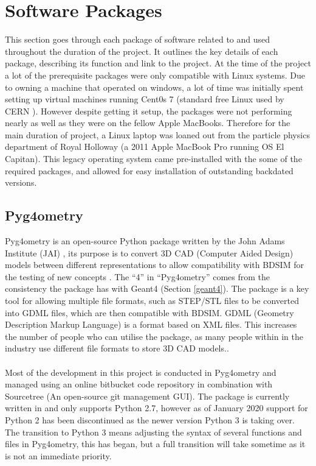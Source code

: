 \documentclass[12pt,a4paper]{article}
\begin{document}

\section{Software Packages}
\label{packs}
This section goes through each package of software related to and used throughout the duration of the project. It outlines the key details of each package, describing its function and link to the project. At the time of the project a lot of the prerequisite packages were only compatible with Linux systems. Due to owning a machine that operated on windows, a lot of time was initially spent setting up virtual machines running Cent0s 7 (standard free Linux used by CERN \cite{cern}). However despite getting it setup, the packages were not performing nearly as well as they were on the fellow Apple MacBooks. Therefore for the main duration of project, a Linux laptop was loaned out from the particle physics department of Royal Holloway (a 2011 Apple MacBook Pro running OS El Capitan). This legacy operating system came pre-installed with the some of the required packages, and allowed for easy installation of outstanding backdated versions.

\subsection{Pyg4ometry}
\label{pyg}
Pyg4ometry is an open-source Python package  written by the John Adams Institute (JAI) \cite{jai}, its purpose is to convert 3D CAD (Computer Aided Design) models between different representations to allow compatibility with BDSIM for the testing of new concepts \cite{pyg4om}. The ``4'' in ``Pyg4ometry'' comes from the consistency the package has with Geant4 (Section \ref{geant4}). The package is a key tool for allowing multiple file formats, such as STEP/STL files to be converted into GDML files, which are then compatible with BDSIM. GDML (Geometry Description Markup Language) is a format based on XML files. This increases the number of people who can utilise the package, as many people within in the industry use different file formats to store 3D CAD models..
\\\\
Most of the development in this project is conducted in Pyg4ometry and managed using an online bitbucket code repository \cite{bitb} in combination with Sourcetree \cite{st} (An open-source git management GUI). The package is currently written in and only supports Python 2.7, however as of January 2020 support for Python 2 has been discontinued as the newer version Python 3 is taking over. The transition to Python 3 means adjusting the syntax of several functions and files in Pyg4ometry, this has began, but a full transition will take sometime as it is not an immediate priority. 
\end{document}
